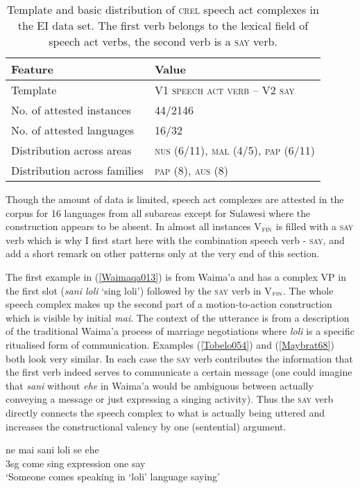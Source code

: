 \begin{table}


\begin{tabular}{ll}
\lsptoprule
Feature&Value\tabularnewline
\hline
Template&V1 \textsc{speech act verb} -- V2 \textsc{\textsc{say}}\tabularnewline
No. of attested instances& 44/2146 \tabularnewline
No. of attested languages& 16/32 \tabularnewline
Distribution across areas& \textsc{nus} (6/11), \textsc{mal} (4/5), \textsc{pap} (6/11) \tabularnewline
Distribution across families& \textsc{pap} (8), \textsc{aus} (8) \tabularnewline
\hline
\end{tabular}
\caption[Template and basic distribution of \textsc{crel} speech act complexes]{Template and basic distribution of \textsc{crel} speech act complexes in the EI data set. The first verb belongs to the lexical field of speech act verbs, the second verb is a \textsc{say} verb.}
\label{table:basiccrelspeech}
\end{table}


Though the amount of data is limited, speech act complexes are attested in the corpus for 16 languages from all subareas except for Sulawesi where the construction appears to be absent. In almost all instances V$_{\textsc{fin}}$ is filled with a \textsc{say} verb which is why I first start here with the combination speech verb - \textsc{say}, and add a short remark on other patterns only at the very end of this section. 

The first example in (\ref{Waimaqa013}) is from Waima'a and has a complex VP in the first slot (\textit{sani loli} `sing loli') followed by the \textsc{say} verb in V$_{\textsc{fin}}$. The whole speech complex makes up the second part of a motion-to-action construction which is visible by initial \textit{mai}. The context of the utterance is from a description of the traditional Waima'a process of marriage negotiations where \textit{loli} is a specific ritualised form of communication. Examples (\ref{Tobelo054}) and (\ref{Maybrat68}) both look very similar. In each case the \textsc{say} verb contributes the information that the first verb indeed serves to communicate a certain message (one could imagine that \textit{sani} without \textit{ehe} in Waima'a would be ambiguous between actually conveying a message or just expressing a singing activity). Thus the \textsc{say} verb directly connects the speech complex to what is actually being uttered and increases the constructional valency by one (sentential) argument. 

\ea \label{Waimaqa013}
\gll ne mai sani loli se ehe \\
\acs{3}\acs{sg} come sing expression one say \\
\glft `Someone comes speaking in `loli' language saying' \\ 
\z
\xe

